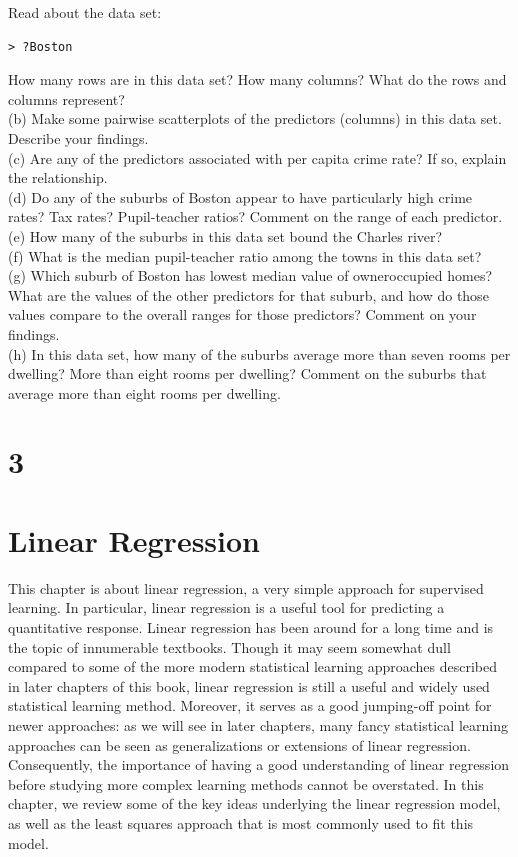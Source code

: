 \documentclass[10pt]{article}
\begin{document}
Read about the data set:

\begin{verbatim}
> ?Boston
\end{verbatim}

How many rows are in this data set? How many columns? What do the rows and columns represent?\\
(b) Make some pairwise scatterplots of the predictors (columns) in this data set. Describe your findings.\\
(c) Are any of the predictors associated with per capita crime rate? If so, explain the relationship.\\
(d) Do any of the suburbs of Boston appear to have particularly high crime rates? Tax rates? Pupil-teacher ratios? Comment on the range of each predictor.\\
(e) How many of the suburbs in this data set bound the Charles river?\\
(f) What is the median pupil-teacher ratio among the towns in this data set?\\
(g) Which suburb of Boston has lowest median value of owneroccupied homes? What are the values of the other predictors for that suburb, and how do those values compare to the overall ranges for those predictors? Comment on your findings.\\
(h) In this data set, how many of the suburbs average more than seven rooms per dwelling? More than eight rooms per dwelling? Comment on the suburbs that average more than eight rooms per dwelling.

\section*{3}
\section*{Linear Regression}
This chapter is about linear regression, a very simple approach for supervised learning. In particular, linear regression is a useful tool for predicting a quantitative response. Linear regression has been around for a long time and is the topic of innumerable textbooks. Though it may seem somewhat dull compared to some of the more modern statistical learning approaches described in later chapters of this book, linear regression is still a useful and widely used statistical learning method. Moreover, it serves as a good jumping-off point for newer approaches: as we will see in later chapters, many fancy statistical learning approaches can be seen as generalizations or extensions of linear regression. Consequently, the importance of having a good understanding of linear regression before studying more complex learning methods cannot be overstated. In this chapter, we review some of the key ideas underlying the linear regression model, as well as the least squares approach that is most commonly used to fit this model.
\end{document}
